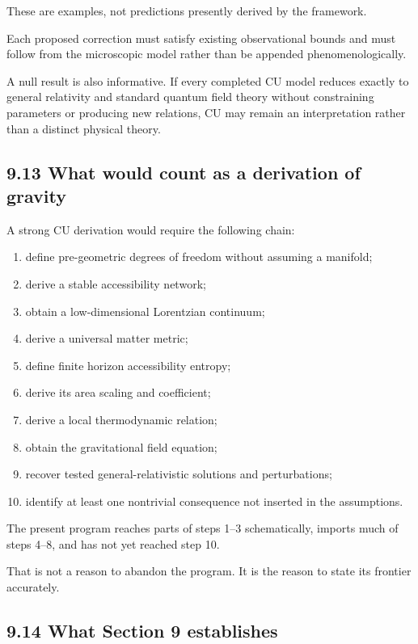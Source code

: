 \documentclass[
  11pt,
]{article}
\providecommand{\tightlist}{%
  \setlength{\itemsep}{0pt}\setlength{\parskip}{0pt}}
\begin{document}
These are examples, not predictions presently derived by the framework.

Each proposed correction must satisfy existing observational bounds and
must follow from the microscopic model rather than be appended
phenomenologically.

A null result is also informative. If every completed CU model reduces
exactly to general relativity and standard quantum field theory without
constraining parameters or producing new relations, CU may remain an
interpretation rather than a distinct physical theory.

\subsection{9.13 What would count as a derivation of
gravity}\label{what-would-count-as-a-derivation-of-gravity}

A strong CU derivation would require the following chain:

\begin{enumerate}
\def\labelenumi{\arabic{enumi}.}
\tightlist
\item
  define pre-geometric degrees of freedom without assuming a manifold;
\item
  derive a stable accessibility network;
\item
  obtain a low-dimensional Lorentzian continuum;
\item
  derive a universal matter metric;
\item
  define finite horizon accessibility entropy;
\item
  derive its area scaling and coefficient;
\item
  derive a local thermodynamic relation;
\item
  obtain the gravitational field equation;
\item
  recover tested general-relativistic solutions and perturbations;
\item
  identify at least one nontrivial consequence not inserted in the
  assumptions.
\end{enumerate}

The present program reaches parts of steps 1--3 schematically, imports
much of steps 4--8, and has not yet reached step 10.

That is not a reason to abandon the program. It is the reason to state
its frontier accurately.

\subsection{9.14 What Section 9
establishes}\label{what-section-9-establishes}
\end{document}
